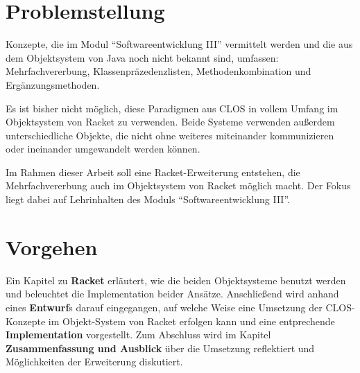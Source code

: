 \section{Problemstellung} %
Konzepte, die im Modul ``Softwareentwicklung III'' vermittelt werden und die aus dem Objektsystem von Java noch nicht bekannt sind, umfassen: Mehrfachvererbung, Klassenpräzedenzlisten, Methodenkombination und Ergänzungsmethoden.

Es ist bisher nicht möglich, diese Paradigmen aus CLOS in vollem Umfang im Objektsystem von Racket zu verwenden. Beide Systeme verwenden außerdem unterschiedliche Objekte, die nicht ohne weiteres miteinander kommunizieren oder ineinander umgewandelt werden können.

Im Rahmen dieser Arbeit soll eine Racket-Erweiterung entstehen, die Mehrfachvererbung auch im Objektsystem von Racket möglich macht. Der Fokus liegt dabei auf Lehrinhalten des Moduls ``Softwareentwicklung III''.


\section{Vorgehen}
Ein Kapitel zu \textbf{Racket} erläutert, wie die beiden Objektsysteme benutzt werden und beleuchtet die Implementation beider Ansätze. Anschließend wird anhand eines \textbf{Entwurf}s darauf eingegangen, auf welche Weise eine Umsetzung der CLOS-Konzepte im Objekt-System von Racket erfolgen kann und eine entprechende \textbf{Implementation} vorgestellt. Zum Abschluss wird im Kapitel \textbf{Zusammenfassung und Ausblick} über die Umsetzung reflektiert und Möglichkeiten der Erweiterung diskutiert.